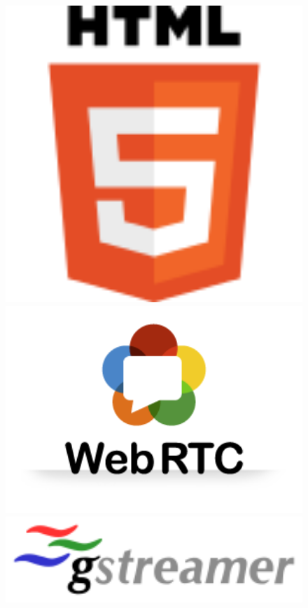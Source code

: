 \documentclass[a4paper, 11pt]{article}
\begin{document}
\begin{figure}[!ht] \centering
        \begin{minipage}[t]{3.5cm}
                \includegraphics[width=1\textwidth]{HTML5_logo.png}
        \end{minipage} 
        \begin{minipage}[t]{3.5cm}
                \includegraphics[width=1\textwidth]{logo_webrtc.png}
        \end{minipage}
         \begin{minipage}[t]{4cm}
                \includegraphics[width=1\textwidth]{Gstreamer_logo.png}
        \end{minipage}
\end{figure}
\end{document}
